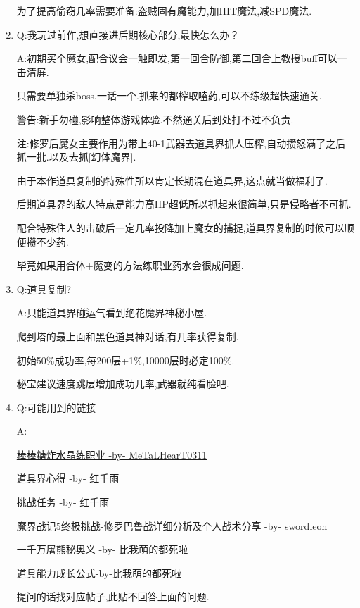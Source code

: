 \begin{enumerate}
	为了提高偷窃几率需要准备:盗贼固有魔能力,加HIT魔法,减SPD魔法.

	\item
	Q:我玩过前作,想直接进后期核心部分,最快怎么办？

	A:初期买个魔女,配合议会一触即发,第一回合防御,第二回合上教授buff可以一击清屏.

	只需要单独杀boss,一话一个.抓来的都榨取嗑药,可以不练级超快速通关.

	警告:新手勿碰,影响整体游戏体验.不然通关后到处打不过不负责.

	注:修罗后魔女主要作用为带上40-1武器去道具界抓人压榨,自动攒怒满了之后抓一批.以及去抓[幻体魔界].

	由于本作道具复制的特殊性所以肯定长期混在道具界,这点就当做福利了.

	后期道具界的敌人特点是能力高HP超低所以抓起来很简单,只是侵略者不可抓.

	配合特殊住人的击破后一定几率投降加上魔女的捕捉,道具界复制的时候可以顺便攒不少药.

	毕竟如果用合体+魔变的方法练职业药水会很成问题.


	\item
	Q:道具复制?

	A:只能道具界碰运气看到绝花魔界神秘小屋.

	爬到塔的最上面和黑色道具神对话,有几率获得复制.

	初始50\%成功率,每200层+1\%,10000层时必定100\%.

	秘宝建议速度跳层增加成功几率,武器就纯看脸吧.

	\item
	Q:可能用到的链接

	A:

	\href{http://tieba.baidu.com/p/3717431968}{棒棒糖炸水晶练职业 -by- MeTaLHearT0311}

	\href{http://tieba.baidu.com/p/3730196003}{道具界心得 -by- 红千雨}

	\href{http://tieba.baidu.com/p/3723862919}{挑战任务 -by- 红千雨}

	\href{http://tieba.baidu.com/p/3949061316}{魔界战记5终极挑战-修罗巴鲁战详细分析及个人战术分享 -by- swordleon}

	\href{http://tieba.baidu.com/p/3825275063}{一千万屠熊秘奥义 -by- 比我萌的都死啦}

	\href{http://tieba.baidu.com/f?kz=3834692385}{道具能力成长公式-by-比我萌的都死啦}

	提问的话找对应帖子,此贴不回答上面的问题.

\end{enumerate}


